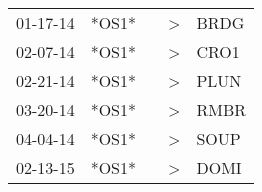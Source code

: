 \begin{supertabular}{lllll}
 01-17-14 &  *OS1* &   &  \textgreater &  BRDG \\
 02-07-14 &  *OS1* &   &  \textgreater &  CRO1 \\
 02-21-14 &  *OS1* &   &  \textgreater &  PLUN \\
 03-20-14 &  *OS1* &   &  \textgreater &  RMBR \\
 04-04-14 &  *OS1* &   &  \textgreater &  SOUP \\
 02-13-15 &  *OS1* &   &  \textgreater &  DOMI \\
\end{supertabular}
